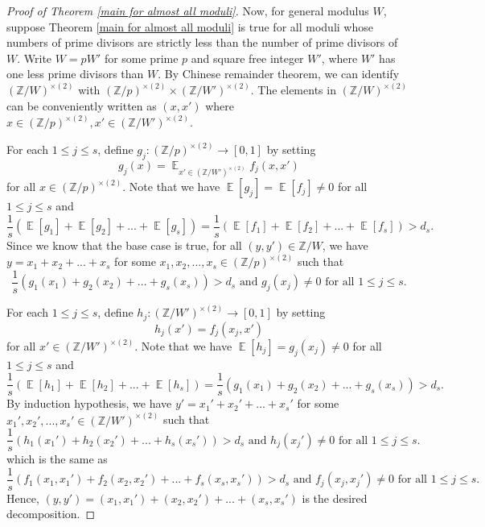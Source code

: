 \documentclass[11pt]{amsart}
\theoremstyle{plain} %
\theoremstyle{remark}
\numberwithin{equation}{section}
\newcommand{\E}{\mathop{\mathbb{E}}}
\newcommand{\Z}{\mathbb{Z}}
\begin{document}
\begin{proof}[Proof of Theorem \ref{main for almost all moduli}]
    Now, for general modulus $W$, suppose Theorem \ref{main for almost all moduli} is true for all moduli whose numbers of prime divisors are strictly less than the number of prime divisors of $W$. Write $W=pW'$ for some prime $p$ and square free integer $W'$, where $W'$ has one less prime divisors than $W$. By Chinese remainder theorem, we can identify $(\Z/W)^{\times(2)}$ with $(\Z/p)^{\times(2)}\times(\Z/W')^{\times(2)}$. The elements in $(\Z/W)^{\times(2)}$ can be conveniently written as $(x,x')$ where $x\in (\Z/p)^{\times(2)},x'\in (\Z/W')^{\times(2)}$.

    For each $1\leq j\leq s$, define $g_j:(\Z/p)^{\times(2)}\longrightarrow[0,1]$ by setting
    \begin{equation*}
        g_j(x)=\E_{x'\in(\Z/W')^{\times(2)}}f_j(x,x')
    \end{equation*}
    for all $x\in(\Z/p)^{\times(2)}$. Note that we have $\E[g_j]=\E[f_j]\neq 0$ for all $1\leq j\leq s$ and
    \begin{equation*}
        \frac{1}{s}(\E[g_1]+\E[g_2]+...+\E[g_s])=\frac{1}{s}(\E[f_1]+\E[f_2]+...+\E[f_s])>d_s.
    \end{equation*}
    Since we know that the base case is true, for all $(y,y')\in \Z/W$, we have $y=x_1+x_2+...+x_s$ for some $x_1,x_2,...,x_s\in (\Z/p)^{\times(2)}$ such that
    \begin{equation*}
        \text{$\frac{1}{s}(g_1(x_1)+g_2(x_2)+...+g_s(x_s))>d_s$ and $g_j(x_j)\neq 0$ for all $1\leq j \leq s$.}
    \end{equation*}

    For each $1\leq j\leq s$, define $h_j:(\Z/W')^{\times(2)}\longrightarrow[0,1]$ by setting
    \begin{equation*}
        h_j(x')=f_j(x_j,x')
    \end{equation*}
    for all $x'\in (\Z/W')^{\times(2)}$. Note that we have $\E[h_j]=g_j(x_j)\neq 0$ for all $1\leq j\leq s$ and
    \begin{equation*}
        \frac{1}{s}(\E[h_1]+\E[h_2]+...+\E[h_s])=\frac{1}{s}(g_1(x_1)+g_2(x_2)+...+g_s(x_s))>d_s.
    \end{equation*}
    By induction hypothesis, we have $y'=x_1'+x_2'+...+x_s'$ for some $x_1',x_2',...,x_s'\in (\Z/W')^{\times(2)}$ such that
    \begin{equation*}
        \text{$\frac{1}{s}(h_1(x_1')+h_2(x_2')+...+h_s(x_s'))>d_s$ and $h_j(x_j')\neq 0$ for all $1\leq j \leq s$.}
    \end{equation*}
    which is the same as
    \begin{equation*}
        \text{$\frac{1}{s}(f_1(x_1,x_1')+f_2(x_2,x_2')+...+f_s(x_s,x_s'))>d_s$ and $f_j(x_j,x_j')\neq 0$ for all $1\leq j \leq s$.}
    \end{equation*}
    Hence, $(y,y')=(x_1,x_1')+(x_2,x_2')+...+(x_s,x_s')$ is the desired decomposition.
\end{proof}
\end{document}

